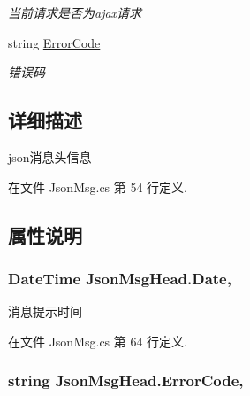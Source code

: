 \begin{DoxyCompactItemize}
\begin{DoxyCompactList}\small\item\em 当前请求是否为ajax请求 \end{DoxyCompactList}\item 
string \hyperlink{class_json_msg_head_ac82489c76531742bf5acba7af986b4eb}{Error\-Code}
\begin{DoxyCompactList}\small\item\em 错误码 \end{DoxyCompactList}\end{DoxyCompactItemize}


\subsection{详细描述}
json消息头信息 



在文件 Json\-Msg.\-cs 第 54 行定义.



\subsection{属性说明}
\hypertarget{class_json_msg_head_af78e10272141d88a221ab89bff532637}{
\subsubsection[{Date}]{\setlength{\rightskip}{0pt plus 5cm}Date\-Time Json\-Msg\-Head.\-Date\hspace{0.3cm}{\ttfamily [get]}, {\ttfamily [set]}}}\label{class_json_msg_head_af78e10272141d88a221ab89bff532637}


消息提示时间 



在文件 Json\-Msg.\-cs 第 64 行定义.

\hypertarget{class_json_msg_head_ac82489c76531742bf5acba7af986b4eb}{
\subsubsection[{Error\-Code}]{\setlength{\rightskip}{0pt plus 5cm}string Json\-Msg\-Head.\-Error\-Code\hspace{0.3cm}{\ttfamily [get]}, {\ttfamily [set]}}}\label{class_json_msg_head_ac82489c76531742bf5acba7af986b4eb}


